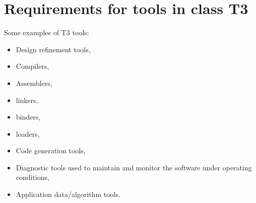 \documentclass{template/openetcs_report}
\begin{document}
\section{Requirements for tools in class T3}
\label{T3}
Some examples of T3 tools: 
\begin{itemize}\itemsep=0pt
  \item Design refinement tools,
  \item Compilers,
  \item Assemblers,
  \item linkers,
  \item binders,
  \item loaders,
  \item Code generation tools,
  \item Diagnostic tools used to maintain and monitor the software under operating conditions,
  \item Application data/algorithm tools.
\end{itemize}
\end{document}
